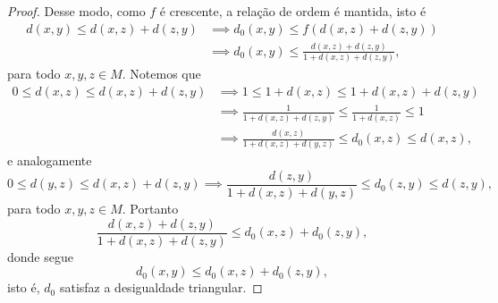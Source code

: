 \begin{proof}
    Desse modo, como \(f\) é crescente, a relação de ordem é mantida, isto é
    \begin{align*}
        d(x,y) \leq d(x,z) + d(z, y) &\implies d_0(x,y) \leq f(d(x,z) + d(z,y))\\
                                     &\implies d_0(x,y) \leq \frac{d(x,z) + d(z,y)}{1 + d(x,z) + d(z,y)},
    \end{align*}
    para todo \(x,y,z \in M\). Notemos que
    \begin{align*}
        0 \leq d(x,z) \leq d(x,z) + d(z,y) &\implies 1 \leq 1 + d(x,z) \leq 1 + d(x,z) + d(z,y)\\
                                           &\implies \frac{1}{1+d(x,z) + d(z,y)} \leq \frac{1}{1+d(x,z)} \leq 1\\
                                           &\implies \frac{d(x,z)}{1+d(x,z)+d(y,z)} \leq d_0(x,z) \leq d(x,z),
    \end{align*}
    e analogamente
    \begin{equation*}
        0 \leq d(y,z) \leq d(x,z) + d(z,y) \implies \frac{d(z,y)}{1+d(x,z)+d(y,z)} \leq d_0(z,y) \leq d(z,y),
    \end{equation*}
    para todo \(x,y,z \in M\). Portanto
    \begin{equation*}
        \frac{d(x,z) + d(z,y)}{1 + d(x,z) + d(z,y)} \leq d_0(x,z) + d_0(z,y),
    \end{equation*}
    donde segue
    \begin{equation*}
        d_0(x,y) \leq d_0(x,z) + d_0(z,y),
    \end{equation*}
    isto é, \(d_0\) satisfaz a desigualdade triangular.
\end{proof}
